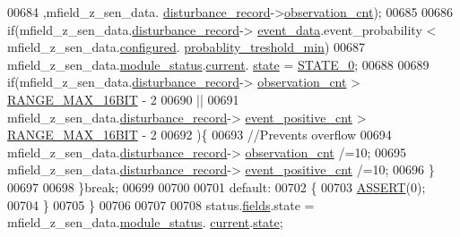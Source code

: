 \begin{DoxyCode}
00684                                                                                    ,mfield\_z\_sen\_data.
      \hyperlink{a00027_ac9b38e2c1d3f1013a88d33506c754152}{disturbance\_record}->\hyperlink{a00028_ad5b0bac02ce266b91b2b52a1c3ea1d78}{observation\_cnt});
00685 
00686              \textcolor{keywordflow}{if}(mfield\_z\_sen\_data.\hyperlink{a00027_ac9b38e2c1d3f1013a88d33506c754152}{disturbance\_record}->
      \hyperlink{a00028_a8c0bda69e71ef674e60da47ad0be9ab0}{event\_data}.event\_probability < mfield\_z\_sen\_data.\hyperlink{a00027_a94b2d1f6ea4ab334c74d24984dd27843}{configured}.
      \hyperlink{a00021_aa59261f74183d4f9e909ac425e0bea35}{probablity\_treshold\_min})
00687                  mfield\_z\_sen\_data.\hyperlink{a00027_adfab5a5d8b45a93dfb13edb24e2b80e3}{module\_status}.\hyperlink{a00019_acf41ffc11da291c2f9f0fcb02ee72b98}{current}.
      \hyperlink{a00019_a6b8d8e916bc56265a3fd279bd26b6d1b}{state} = \hyperlink{a00021_ad6739dbbe5581cac99b7dc8a5e09949c}{STATE\_0};
00688 
00689              \textcolor{keywordflow}{if}(mfield\_z\_sen\_data.\hyperlink{a00027_ac9b38e2c1d3f1013a88d33506c754152}{disturbance\_record}->
      \hyperlink{a00028_ad5b0bac02ce266b91b2b52a1c3ea1d78}{observation\_cnt} > \hyperlink{a00021_ae01726ef8ba0a9e1fe8655dc382ecda8}{RANGE\_MAX\_16BIT} - 2
00690                 ||
00691                 mfield\_z\_sen\_data.\hyperlink{a00027_ac9b38e2c1d3f1013a88d33506c754152}{disturbance\_record}->
      \hyperlink{a00028_a7397b9d76d4b57500f27bb23d258a18a}{event\_positive\_cnt} > \hyperlink{a00021_ae01726ef8ba0a9e1fe8655dc382ecda8}{RANGE\_MAX\_16BIT} - 2
00692                 )\{
00693              \textcolor{comment}{//Prevents overflow}
00694               mfield\_z\_sen\_data.\hyperlink{a00027_ac9b38e2c1d3f1013a88d33506c754152}{disturbance\_record}->
      \hyperlink{a00028_ad5b0bac02ce266b91b2b52a1c3ea1d78}{observation\_cnt}    /=10;
00695               mfield\_z\_sen\_data.\hyperlink{a00027_ac9b38e2c1d3f1013a88d33506c754152}{disturbance\_record}->
      \hyperlink{a00028_a7397b9d76d4b57500f27bb23d258a18a}{event\_positive\_cnt} /=10;
00696              \}
00697 
00698         \}\textcolor{keywordflow}{break};
00699 
00700 
00701         \textcolor{keywordflow}{default}:
00702         \{
00703             \hyperlink{a00072_abb8ff8e213ac9f6fb21d2b968583b936}{ASSERT}(0);
00704         \}
00705     \}
00706 
00707 
00708     status.\hyperlink{a00021_a5296d090c085b0421fdf5a86e382abea}{fields}.state = mfield\_z\_sen\_data.\hyperlink{a00027_adfab5a5d8b45a93dfb13edb24e2b80e3}{module\_status}.
      \hyperlink{a00019_acf41ffc11da291c2f9f0fcb02ee72b98}{current}.\hyperlink{a00019_a6b8d8e916bc56265a3fd279bd26b6d1b}{state};

\end{DoxyCode}

